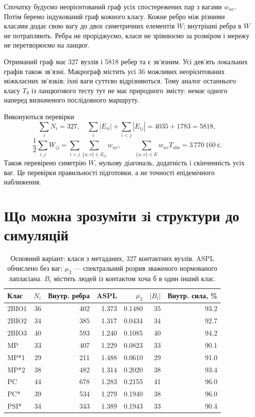 \documentclass[11pt,a4paper]{article}
\begin{document}
Спочатку будуємо неорієнтований граф усіх спостережених пар з вагами $w_{uv}$. Потім беремо індукований граф кожного класу. Кожне ребро між різними класами додає свою вагу до двох симетричних елементів $W$; внутрішні ребра в $W$ не потрапляють. Ребра не проріджуємо, класи не зрівнюємо за розміром і мережу не перетворюємо на ланцюг.

Отриманий граф має 327 вузлів і 5818 ребер та є зв'язним. Усі дев'ять локальних графів також зв'язні. Макрограф містить усі 36 можливих неорієнтованих міжкласних зв'язків; їхні ваги суттєво відрізняються. Тому аналог останнього класу $T_9$ із ланцюгового тесту тут не має природного змісту: немає одного наперед визначеного послідовного маршруту.

Виконуються перевірки
\[
\sum_iN_i=327,\quad \sum_i|E_{ii}|+\sum_{i<j}|E_{ij}|=4035+1783=5818,
\]
\[
\frac12\sum_{i,j}W_{ij}=\sum_{i<j}\sum_{\{u,v\}\in E_{ij}}w_{uv},\qquad
\sum_{\{u,v\}\in E}w_{uv}T_{\mathrm{obs}}=3\,770\,160\ \text{с}.
\]
Також перевірено симетрію $W$, нульову діагональ, додатність і скінченність усіх ваг. Це перевірки правильності підготовки, а не точності епідемічного наближення.

\section{Що можна зрозуміти зі структури до симуляцій}
\begin{table}[htbp]
\centering\small
\caption{Основний варіант: класи з метаданих, 327 контактних вузлів. ASPL обчислено без ваг; $\mu_2$ --- спектральний розрив зваженого нормованого лапласіана. $B_i$ містить людей із контактом хоча б в один інший клас.}
\begin{tabular}{lrrrrrr}
\toprule
Клас & $N_i$ & Внутр. ребра & ASPL & $\mu_2$ & $|B_i|$ & Внутр. сила, \%\\
\midrule
2BIO1 &36&402&1.373&0.1480&35&93.2\\
2BIO2 &34&385&1.317&0.0434&34&92.7\\
2BIO3 &40&593&1.240&0.1085&40&94.2\\
MP    &33&407&1.229&0.0823&33&90.1\\
MP*1  &29&211&1.488&0.0610&29&91.0\\
MP*2  &38&482&1.314&0.2020&38&93.4\\
PC    &44&678&1.283&0.2155&41&96.0\\
PC*   &39&534&1.279&0.1940&38&96.0\\
PSI*  &34&343&1.389&0.1943&33&90.4\\
\bottomrule
\end{tabular}
\end{table}
\end{document}
